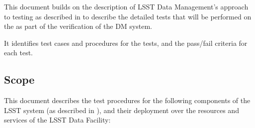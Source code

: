 \documentclass[DM,lsstdraft,STS,toc]{lsstdoc}
\begin{document}
This document builds on the description of LSST Data Management's approach to testing as described in  to describe the detailed tests that will be performed on the \product{} as part of the verification of the DM system.

It identifies test cases and procedures for the tests, and the pass/fail criteria for each test.

\subsection{Scope}
\label{sec:scope}

This document describes the test procedures for the following components of the LSST system (as described in ), and their deployment over the resources and services of the LSST Data Facility:
\end{document}
